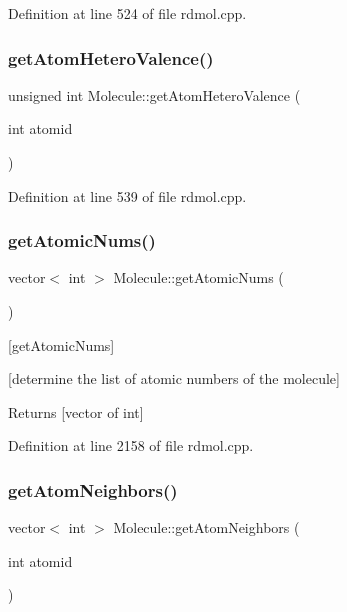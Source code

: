 Definition at line 524 of file rdmol.\+cpp.

\mbox{\label{class_molecule_a1ff2823d05fb0c104bef3a2af09b4a21}} 
\subsubsection{\texorpdfstring{get\+Atom\+Hetero\+Valence()}{getAtomHeteroValence()}}
{\footnotesize\ttfamily unsigned int Molecule\+::get\+Atom\+Hetero\+Valence (\begin{DoxyParamCaption}\item[{int}]{atomid }\end{DoxyParamCaption})}



Definition at line 539 of file rdmol.\+cpp.

\mbox{\label{class_molecule_ac4010a4be90b8f109903d41a05d3ff81}} 
\subsubsection{\texorpdfstring{get\+Atomic\+Nums()}{getAtomicNums()}}
{\footnotesize\ttfamily vector$<$ int $>$ Molecule\+::get\+Atomic\+Nums (\begin{DoxyParamCaption}{ }\end{DoxyParamCaption})}



\mbox{[}get\+Atomic\+Nums\mbox{]} 

\mbox{[}determine the list of atomic numbers of the molecule\mbox{]}

\begin{DoxyReturn}{Returns}
\mbox{[}vector of int\mbox{]} 
\end{DoxyReturn}


Definition at line 2158 of file rdmol.\+cpp.

\mbox{\label{class_molecule_a8a7e0db0469ed164e76f4fc48f4e387b}} 
\subsubsection{\texorpdfstring{get\+Atom\+Neighbors()}{getAtomNeighbors()}}
{\footnotesize\ttfamily vector$<$ int $>$ Molecule\+::get\+Atom\+Neighbors (\begin{DoxyParamCaption}\item[{int}]{atomid }\end{DoxyParamCaption})}



